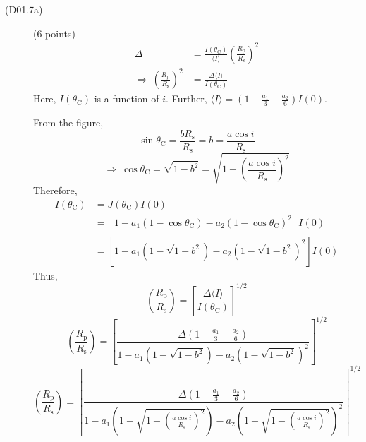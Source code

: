\begin{description}
\item[(D01.7a)] \hfill(6 points)
\begin{align*}
\Delta &= \frac{I(\theta_{\mathrm{C}})}{\langle I\rangle}
  \left(\frac{R_{\mathrm{p}}}{R_{\mathrm{s}}}\right)^2\\
\Longrightarrow\ \left(\frac{R_{\mathrm{p}}}{R_{\mathrm{s}}}\right)^2
  &= \frac{\Delta\langle I\rangle}{I(\theta_{\mathrm{C}})}
\end{align*}
Here, $I(\theta_{\mathrm{C}})$ is a function of $i$. Further,
$\langle I\rangle = \left(1-\frac{a_1}{3}-\frac{a_2}{6}\right)I(0)$.

From the figure,
\[ \sin\theta_{\mathrm{C}} = \frac{bR_{\mathrm{s}}}{R_{\mathrm{s}}} = b
   = \frac{a\cos i}{R_{\mathrm{s}}} \]
\[ \Longrightarrow\ \cos\theta_{\mathrm{C}} = \sqrt{1-b^2}
   = \sqrt{1-\left(\frac{a\cos i}{R_{\mathrm{s}}}\right)^2} \]
Therefore,
\begin{align*}
I(\theta_{\mathrm{C}}) &= J(\theta_{\mathrm{C}})I(0)\\
  &= \left[1 - a_1(1-\cos\theta_{\mathrm{C}})
    - a_2(1-\cos\theta_{\mathrm{C}})^2\right]I(0)\\
  &= \left[1 - a_1\left(1-\sqrt{1-b^2}\right)
    - a_2\left(1-\sqrt{1-b^2}\right)^2\right]I(0)
\end{align*}
Thus,
\[ \left(\frac{R_{\mathrm{p}}}{R_{\mathrm{s}}}\right)
   = \left[\frac{\Delta\langle I\rangle}{I(\theta_{\mathrm{C}})}\right]^{1/2} \]
\[ \left(\frac{R_{\mathrm{p}}}{R_{\mathrm{s}}}\right)
   = \left[\frac{\Delta\left(1-\frac{a_1}{3}-\frac{a_2}{6}\right)}
   {1 - a_1\left(1-\sqrt{1-b^2}\right)
    - a_2\left(1-\sqrt{1-b^2}\right)^2}\right]^{1/2} \]
\[ \left(\frac{R_{\mathrm{p}}}{R_{\mathrm{s}}}\right)
   = \left[\frac{\Delta\left(1-\frac{a_1}{3}-\frac{a_2}{6}\right)}
   {1 - a_1\left(1-\sqrt{1-\left(\frac{a\cos i}{R_{\mathrm{s}}}\right)^2}\right)
    - a_2\left(1-\sqrt{1-\left(\frac{a\cos i}{R_{\mathrm{s}}}\right)^2}\right)^{2}}
   \right]^{1/2} \]


\end{description}
